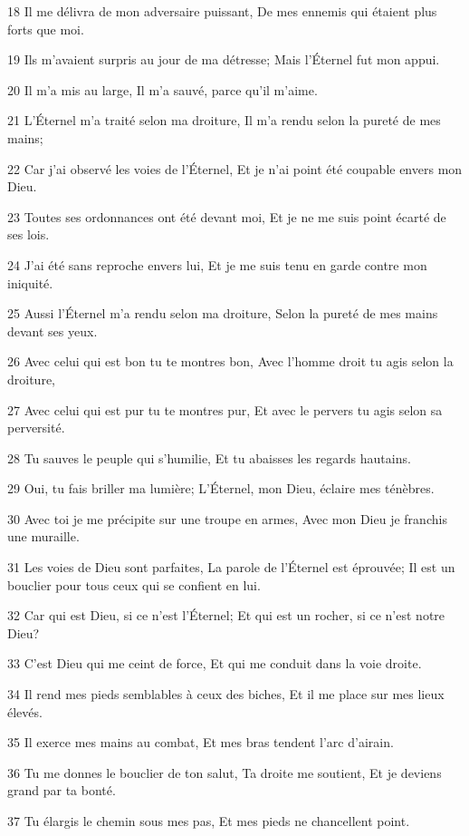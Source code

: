 \par 18 Il me délivra de mon adversaire puissant, De mes ennemis qui étaient plus forts que moi.
\par 19 Ils m'avaient surpris au jour de ma détresse; Mais l'Éternel fut mon appui.
\par 20 Il m'a mis au large, Il m'a sauvé, parce qu'il m'aime.
\par 21 L'Éternel m'a traité selon ma droiture, Il m'a rendu selon la pureté de mes mains;
\par 22 Car j'ai observé les voies de l'Éternel, Et je n'ai point été coupable envers mon Dieu.
\par 23 Toutes ses ordonnances ont été devant moi, Et je ne me suis point écarté de ses lois.
\par 24 J'ai été sans reproche envers lui, Et je me suis tenu en garde contre mon iniquité.
\par 25 Aussi l'Éternel m'a rendu selon ma droiture, Selon la pureté de mes mains devant ses yeux.
\par 26 Avec celui qui est bon tu te montres bon, Avec l'homme droit tu agis selon la droiture,
\par 27 Avec celui qui est pur tu te montres pur, Et avec le pervers tu agis selon sa perversité.
\par 28 Tu sauves le peuple qui s'humilie, Et tu abaisses les regards hautains.
\par 29 Oui, tu fais briller ma lumière; L'Éternel, mon Dieu, éclaire mes ténèbres.
\par 30 Avec toi je me précipite sur une troupe en armes, Avec mon Dieu je franchis une muraille.
\par 31 Les voies de Dieu sont parfaites, La parole de l'Éternel est éprouvée; Il est un bouclier pour tous ceux qui se confient en lui.
\par 32 Car qui est Dieu, si ce n'est l'Éternel; Et qui est un rocher, si ce n'est notre Dieu?
\par 33 C'est Dieu qui me ceint de force, Et qui me conduit dans la voie droite.
\par 34 Il rend mes pieds semblables à ceux des biches, Et il me place sur mes lieux élevés.
\par 35 Il exerce mes mains au combat, Et mes bras tendent l'arc d'airain.
\par 36 Tu me donnes le bouclier de ton salut, Ta droite me soutient, Et je deviens grand par ta bonté.
\par 37 Tu élargis le chemin sous mes pas, Et mes pieds ne chancellent point.
